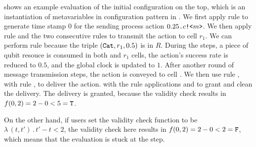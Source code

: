  shows an example evaluation of the initial configuration on the top,
which is an instantiation of metavariables in configuration pattern in .
We first apply rule  to generate time stamp $0$ for the sending process action $0.25\texttt{.}c\texttt{!<}m\texttt{>}$.
We then apply rule  and the two consecutive rules to transmit the action to cell $r_1$.
We can perform rule  because the triple $(\texttt{Cat},r_1,0.5)$ is in $R$.
During the steps, a piece of qubit resouce is consumed in both  and $r_1$ cells, the action's success rate is reduced to $0.5$, and the global clock is updated to $1$.
After another round of message transmission steps, the action is conveyed to cell .
We then use rule , with rule , to deliver the action.
with the rule applications  and  to grant and clean the delivery.
The delivery is granted, because the validity check results in $f(0,2)=2-0<5=\texttt{T}$.

On the other hand, if users set the validity check function to be $\lambda\,(t,t')\,.\,t'-t<2$,
the validity check here results in $f(0,2)=2-0<2=\texttt{F}$, which means that the evaluation is stuck at the  step.







